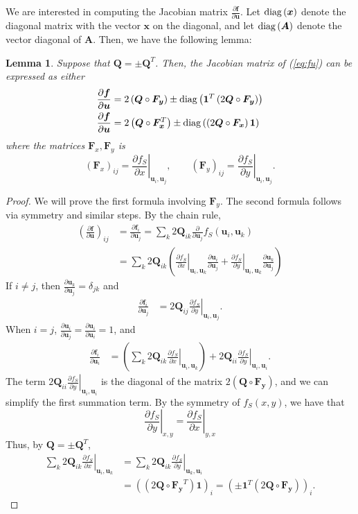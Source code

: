 \documentclass{article}
\newtheorem{lemma}[theorem]{Lemma}
\newcommand{\diag}[1]{{\rm diag}\LRp{#1}}
\newcommand{\pd}[2]{\frac{\partial#1}{\partial#2}}
\newcommand{\LRp}[1]{\left( #1 \right)}
\newcommand{\LRl}[1]{\left. #1 \right|}
\newcommand{\eq}[1]{\begin{align*}#1\end{align*}}
\begin{document}
We are interested in computing the Jacobian matrix $\pd{\bm{f}}{\bm{u}}$. Let $\diag{\bm{x}}$ denote the diagonal matrix with the vector $\bm{x}$ on the diagonal, and let $\diag{\bm{A}}$ denote the vector diagonal of $\bm{A}$.  Then, we have the following lemma:
\begin{lemma}
\label{lemma:explicitJ}
Suppose that $\bm{Q} = \pm\bm{Q}^T$.  Then, the Jacobian matrix of (\ref{eq:fu}) can be expressed as either
\eq{
\pd{\bm{f}}{\bm{u}} &= 2\LRp{\bm{Q}\circ \bm{F_y}} \pm \diag{\bm{1}^T\LRp{2\bm{Q}\circ \bm{F_y}}}\\
\pd{\bm{f}}{\bm{u}} &= 2\LRp{\bm{Q}\circ \bm{F_x}^T} \pm \diag{\LRp{2\bm{Q} \circ \bm{F_x}}\bm{1}}
}
where the matrices $\bm{F}_x,\bm{F}_y$ is 
\[
\LRp{\bm{F}_x}_{ij} = \LRl{\pd{f_S}{x}}_{\bm{u}_i,\bm{u}_j}, \qquad \LRp{\bm{F}_y}_{ij} = \LRl{\pd{f_S}{y}}_{\bm{u}_i,\bm{u}_j}.
\]
\end{lemma}
\begin{proof}
We will prove the first formula involving $\bm{F}_y$.  The second formula follows via symmetry and similar steps.  By the chain rule,
\begin{align*}
\LRp{\pd{\bm{f}}{\bm{u}}}_{ij} &= \pd{\bm{f}_i}{\bm{u}_j} =  \sum_{k} 2\bm{Q}_{ik} \pd{}{\bm{u}_j}f_S\LRp{\bm{u}_i,\bm{u}_k}\\
&= \sum_{k} 2\bm{Q}_{ik} \LRp{\LRl{ \pd{f_S}{x}}_{\bm{u}_i,\bm{u}_k}\pd{\bm{u}_i}{\bm{u}_j} + \LRl{\pd{f_S}{y}}_{\bm{u}_i,\bm{u}_k} \pd{\bm{u}_k}{\bm{u}_j}}
\end{align*}
If $i\neq j$, then $\pd{\bm{u}_k}{\bm{u}_j} = \delta_{jk}$ and
\begin{align*}
\pd{\bm{f}_i}{\bm{u}_j} &= 2\bm{Q}_{ij} \LRl{\pd{f_S}{y}}_{\bm{u}_i,\bm{u}_j}.
\end{align*}
When $i=j$, $\pd{\bm{u}_i}{\bm{u}_j} = \pd{\bm{u}_i}{\bm{u}_i} = 1$, and 
\begin{align*}
\pd{\bm{f}_i}{\bm{u}_i} &= 
\LRp{\sum_{k} 2 \bm{Q}_{ik} \LRl{\pd{f_S}{x}}_{\bm{u}_i,\bm{u}_k}} + 2\bm{Q}_{ii}\LRl{\pd{f_S}{y}}_{\bm{u}_i,\bm{u}_i}.
\end{align*}
The term $2\bm{Q}_{ii}\LRl{\pd{f_S}{y}}_{\bm{u}_i,\bm{u}_i}$ is the diagonal of the matrix $2\LRp{\bm{Q}\circ \bm{F_y}}$, and we can simplify the first summation term.  By the symmetry of $f_S(x,y)$, we have that
\[
\LRl{\pd{f_S}{y}}_{x,y} = \LRl{\pd{f_S}{x}}_{y,x}
\]
Thus, by $\bm{Q} = \pm\bm{Q}^T$, 
\begin{align*}
\sum_k 2\bm{Q}_{ik} \LRl{\pd{f_S}{x}}_{\bm{u}_i,\bm{u}_k} &= \sum_k 2\bm{Q}_{ik} \LRl{\pd{f_S}{y}}_{\bm{u}_k,\bm{u}_i}\\
&= \LRp{\LRp{2\bm{Q}\circ \bm{F_y}^T} \bm{1}}_i = \LRp{\pm\bm{1}^T\LRp{2\bm{Q}\circ \bm{F_y}}}_i.
\end{align*}
\end{proof}
\end{document}
